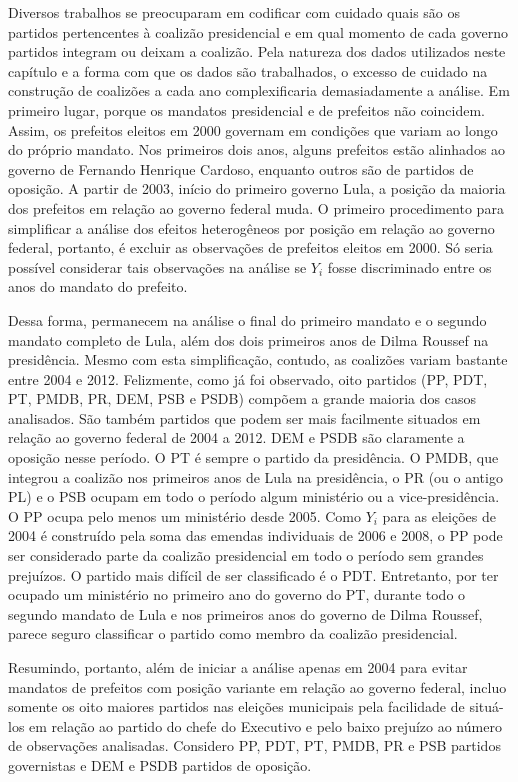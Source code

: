 Diversos trabalhos se preocuparam em codificar com cuidado quais são os partidos pertencentes à coalizão presidencial e em qual momento de cada governo partidos integram ou deixam a coalizão. Pela natureza dos dados utilizados neste capítulo e a forma com que os dados são trabalhados, o excesso de cuidado na construção de coalizões a cada ano complexificaria demasiadamente a análise. Em primeiro lugar, porque os mandatos presidencial e de prefeitos não coincidem. Assim, os prefeitos eleitos em 2000 governam em condições que variam ao longo do próprio mandato. Nos primeiros dois anos, alguns prefeitos estão alinhados ao governo de Fernando Henrique Cardoso, enquanto outros são de partidos de oposição. A partir de 2003, início do primeiro governo Lula, a posição da maioria dos prefeitos em relação ao governo federal muda. O primeiro procedimento para simplificar a análise dos efeitos heterogêneos por posição em relação ao governo federal, portanto, é excluir as observações de prefeitos eleitos em 2000. Só seria possível considerar tais observações na análise se $Y_{i}$ fosse discriminado entre os anos do mandato do prefeito.

Dessa forma, permanecem na análise o final do primeiro mandato e o segundo mandato completo de Lula, além dos dois primeiros anos de Dilma Roussef na presidência. Mesmo com esta simplificação, contudo, as coalizões variam bastante entre 2004 e 2012. Felizmente, como já foi observado, oito partidos (PP, PDT, PT, PMDB, PR, DEM, PSB e PSDB) compõem a grande maioria dos casos analisados. São também partidos que podem ser mais facilmente situados em relação ao governo federal de 2004 a 2012. DEM e PSDB são claramente a oposição nesse período. O PT é sempre o partido da presidência. O PMDB, que integrou a coalizão nos primeiros anos de Lula na presidência, o PR (ou o antigo PL) e o PSB ocupam em todo o período algum ministério ou a vice-presidência. O PP ocupa pelo menos um  ministério desde 2005. Como $Y_{i}$ para as eleições de 2004 é construído pela soma das emendas individuais de 2006 e 2008, o PP pode ser considerado parte da coalizão presidencial em todo o período sem grandes prejuízos. O partido mais difícil de ser classificado é o PDT. Entretanto, por ter ocupado um ministério no primeiro ano do governo do PT, durante todo o segundo mandato de Lula e nos primeiros anos do governo de Dilma Roussef, parece seguro classificar o partido como membro da coalizão presidencial.

Resumindo, portanto, além de iniciar a análise apenas em 2004 para evitar mandatos de prefeitos com posição variante em relação ao governo federal, incluo somente os oito maiores partidos nas eleições municipais pela facilidade de situá-los em relação ao partido do chefe do Executivo e pelo baixo prejuízo ao número de observações analisadas. Considero PP, PDT, PT, PMDB, PR e PSB partidos governistas e DEM e PSDB partidos de oposição.

